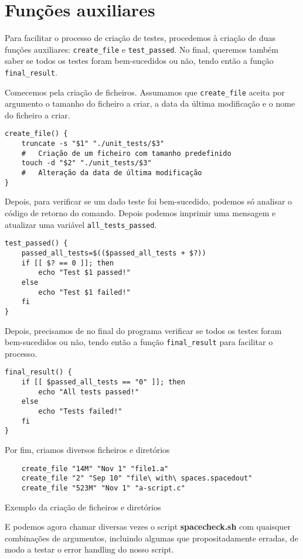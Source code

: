 \section{Funções auxiliares}

Para facilitar o processo de criação de testes, procedemos à criação de duas funções auxiliares: \verb|create_file| e
\verb|test_passed|. No final, queremos também saber se todos os testes foram bem-sucedidos ou não, tendo então a função
\verb|final_result|.

Comecemos pela criação de ficheiros. Assumamos que \verb|create_file| aceita por argumento o tamanho do ficheiro a
criar, a data da última modificação e o nome do ficheiro a criar.
\begin{verbatim}
create_file() {
    truncate -s "$1" "./unit_tests/$3"
    #   Criação de um ficheiro com tamanho predefinido
    touch -d "$2" "./unit_tests/$3"
    #   Alteração da data de última modificação
}
\end{verbatim}

Depois, para verificar se um dado teste foi bem-sucedido, podemos só analisar o código de retorno do comando. Depois
podemos imprimir uma mensagem e atualizar uma variável \verb|all_tests_passed|.

\begin{verbatim}
test_passed() {
    passed_all_tests=$(($passed_all_tests + $?))
    if [[ $? == 0 ]]; then
        echo "Test $1 passed!"
    else
        echo "Test $1 failed!"
    fi
}
\end{verbatim}

Depois, precisamos de no final do programa verificar se todos os testes foram bem-sucedidos ou não, tendo então a função
\verb|final_result| para facilitar o processo.

\begin{verbatim}
final_result() {
    if [[ $passed_all_tests == "0" ]]; then
        echo "All tests passed!"
    else
        echo "Tests failed!"
    fi
}
\end{verbatim}

Por fim, criamos diversos ficheiros e diretórios
\begin{listing}[H]
\begin{verbatim}
    create_file "14M" "Nov 1" "file1.a"
    create_file "2" "Sep 10" "file\ with\ spaces.spacedout"
    create_file "523M" "Nov 1" "a-script.c"
\end{verbatim}
\caption{Exemplo da criação de ficheiros e diretórios}
\end{listing}
E podemos agora chamar diversas vezes o script \textbf{spacecheck.sh} com quaisquer combinações de argumentos, incluindo
algumas que propositadamente erradas, de modo a testar o error handling do nosso script.
